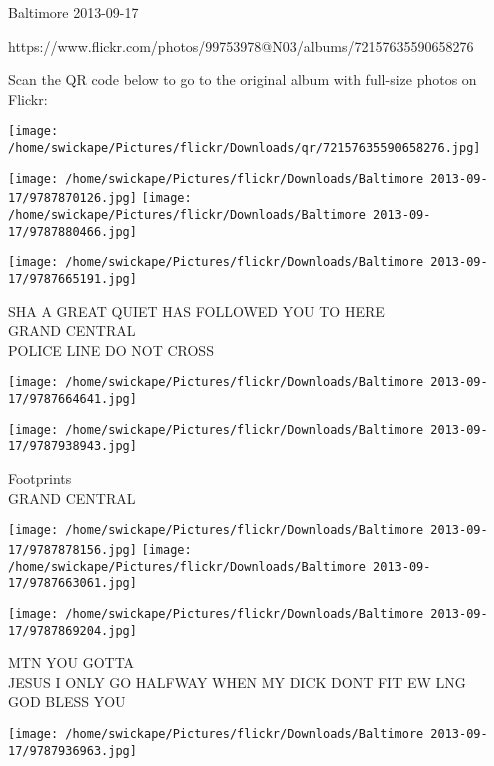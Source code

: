 \documentclass[10pt,letterpaper]{article}
\begin{document}
Baltimore 2013-09-17

https://www.flickr.com/photos/99753978@N03/albums/72157635590658276

Scan the QR code below to go to the original album with full-size photos on Flickr:

\texttt{[image: /home/swickape/Pictures/flickr/Downloads/qr/72157635590658276.jpg]}
\pagebreak

\texttt{[image: /home/swickape/Pictures/flickr/Downloads/Baltimore 2013-09-17/9787870126.jpg]}
\texttt{[image: /home/swickape/Pictures/flickr/Downloads/Baltimore 2013-09-17/9787880466.jpg]}

\vspace{0.25in}
\texttt{[image: /home/swickape/Pictures/flickr/Downloads/Baltimore 2013-09-17/9787665191.jpg]}

SHA A GREAT QUIET HAS FOLLOWED YOU TO HERE\\
GRAND CENTRAL\\
POLICE LINE DO NOT CROSS\\
\pagebreak

\texttt{[image: /home/swickape/Pictures/flickr/Downloads/Baltimore 2013-09-17/9787664641.jpg]}

\vspace{0.25in}
\texttt{[image: /home/swickape/Pictures/flickr/Downloads/Baltimore 2013-09-17/9787938943.jpg]}

Footprints\\
GRAND CENTRAL\\
\pagebreak

\texttt{[image: /home/swickape/Pictures/flickr/Downloads/Baltimore 2013-09-17/9787878156.jpg]}
\texttt{[image: /home/swickape/Pictures/flickr/Downloads/Baltimore 2013-09-17/9787663061.jpg]}

\vspace{0.25in}
\texttt{[image: /home/swickape/Pictures/flickr/Downloads/Baltimore 2013-09-17/9787869204.jpg]}

MTN YOU GOTTA\\
JESUS I ONLY GO HALFWAY WHEN MY DICK DONT FIT EW LNG\\
GOD BLESS YOU\\
\pagebreak

\texttt{[image: /home/swickape/Pictures/flickr/Downloads/Baltimore 2013-09-17/9787936963.jpg]}
\end{document}
